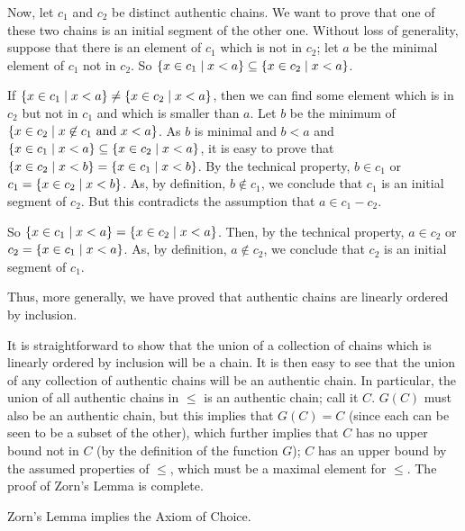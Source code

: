 Now, let $c_1$ and $c_2$ be distinct authentic chains.
We want to prove that one of these two chains is an initial
segment of the other one.
Without loss of generality, suppose that there is an element of $c_1$ which
is not in $c_2$;
let $a$ be the minimal element of $c_1$ not in $c_2$.
So $\{x \in c_1 \mid x < a\} \subseteq \{x \in c_2 \mid x < a\}$.

If $\{x \in c_1 \mid x < a\} \neq \{x \in c_2 \mid x < a\}$, then we can
find some element which is in $c_2$ but not in $c_1$ and which is
smaller than $a$.
Let $b$ be the minimum of $\{x \in c_2 \mid x \not\in c_1 \mbox{ and }
x < a\}$.
As $b$ is minimal and $b < a$ and $\{x \in c_1 \mid x < a\} \subseteq \{x
\in c_2 \mid x < a\}$, it is easy to prove that
$\{x \in c_2 \mid x < b\} = \{x \in c_1 \mid x < b\}$.
By the technical property, $b\in c_1$ or $c_1 = \{x \in c_2 \mid x < b\}$.
As, by definition, $b \not\in c_1$, we conclude that $c_1$ is an initial
segment of $c_2$.
But this contradicts the assumption that $a \in c_1 -
c_2$.

So $\{x \in c_1 \mid x < a\} = \{x \in c_2 \mid x < a\}$.
Then, by the technical property, $a\in c_2$ or
$c_2 = \{x \in c_1 \mid x < a\}$.
As, by definition, $a \not\in c_2$, we conclude that $c_2$ is an initial
segment of $c_1$.

Thus, more generally, we have proved that authentic
chains are linearly
ordered by inclusion.

It is straightforward to show that the union of a
collection of chains which is linearly ordered by
inclusion will be a chain.  It is then easy to see
that the union of any collection of authentic chains will be an
authentic chain.  In particular, the
union of all authentic chains in $\leq$ is an authentic chain;
call it $C$.  $G(C)$ 
must also be an authentic chain, but this implies that $G(C) = C$
(since each can be seen to be a subset of the other), which further
implies that $C$ has no upper bound not in $C$ (by
the definition of the function $G$); $C$ has an upper
bound by the assumed properties of $\leq$, which must be a maximal
element for $\leq$.  The proof of Zorn's Lemma is complete.
\finpreuve


\begin{thm}
 Zorn's Lemma implies the Axiom of Choice.
\end{thm}

